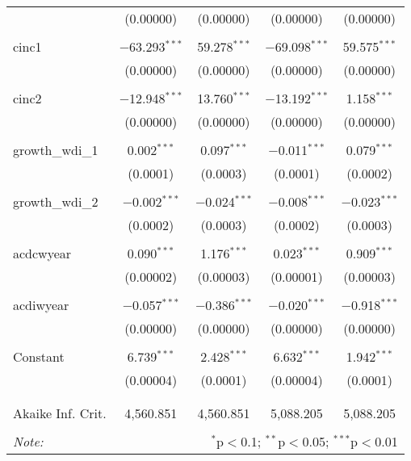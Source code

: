 \begin{table}[!htbp]
\begin{tabular}{@{\extracolsep{5pt}}lcccc}
  & (0.00000) & (0.00000) & (0.00000) & (0.00000) \\ 
  & & & & \\ 
 cinc1 & $-$63.293$^{***}$ & 59.278$^{***}$ & $-$69.098$^{***}$ & 59.575$^{***}$ \\ 
  & (0.00000) & (0.00000) & (0.00000) & (0.00000) \\ 
  & & & & \\ 
 cinc2 & $-$12.948$^{***}$ & 13.760$^{***}$ & $-$13.192$^{***}$ & 1.158$^{***}$ \\ 
  & (0.00000) & (0.00000) & (0.00000) & (0.00000) \\ 
  & & & & \\ 
 growth\_wdi\_1 & 0.002$^{***}$ & 0.097$^{***}$ & $-$0.011$^{***}$ & 0.079$^{***}$ \\ 
  & (0.0001) & (0.0003) & (0.0001) & (0.0002) \\ 
  & & & & \\ 
 growth\_wdi\_2 & $-$0.002$^{***}$ & $-$0.024$^{***}$ & $-$0.008$^{***}$ & $-$0.023$^{***}$ \\ 
  & (0.0002) & (0.0003) & (0.0002) & (0.0003) \\ 
  & & & & \\ 
 acdcwyear & 0.090$^{***}$ & 1.176$^{***}$ & 0.023$^{***}$ & 0.909$^{***}$ \\ 
  & (0.00002) & (0.00003) & (0.00001) & (0.00003) \\ 
  & & & & \\ 
 acdiwyear & $-$0.057$^{***}$ & $-$0.386$^{***}$ & $-$0.020$^{***}$ & $-$0.918$^{***}$ \\ 
  & (0.00000) & (0.00000) & (0.00000) & (0.00000) \\ 
  & & & & \\ 
 Constant & 6.739$^{***}$ & 2.428$^{***}$ & 6.632$^{***}$ & 1.942$^{***}$ \\ 
  & (0.00004) & (0.0001) & (0.00004) & (0.0001) \\ 
  & & & & \\ 
\hline \\[-1.8ex] 
Akaike Inf. Crit. & 4,560.851 & 4,560.851 & 5,088.205 & 5,088.205 \\ 
\hline 
\hline \\[-1.8ex] 
\textit{Note:}  & \multicolumn{4}{r}{$^{*}$p$<$0.1; $^{**}$p$<$0.05; $^{***}$p$<$0.01} \\ 
\end{tabular} 
\end{table} 
